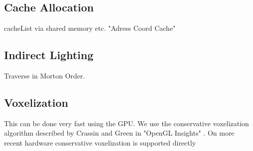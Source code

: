 \documentclass[thesis.tex]{subfiles}
\begin{document}
\subsection{Cache Allocation} \label{sec:impl:cachealloc}
cacheList via shared memory etc.
"Adress Coord Cache"

\subsection{Indirect Lighting}

Traverse in Morton Order.

\subsection{Voxelization}
This can be done very fast using the GPU.
We use the conservative voxelization algorithm described by Crassin and Green in "OpenGL Insights" \cite{bib:openglinsightsvoxel}.
On more recent hardware conservative voxelization is supported directly

\subfilebib %
\end{document}
